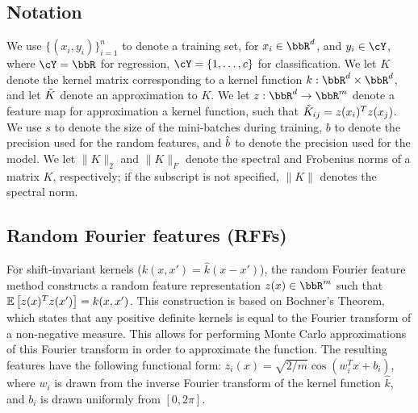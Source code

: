 \subsection{Notation}
We use $\{(x_i,y_i)\}_{i=1}^n$ to denote a training set, for $x_i \in \RR^d$, and $y_i \in \cY$, where $\cY = \RR$ for regression, $\cY = \{1,\ldots,c\}$ for classification.  We let $K$ denote the kernel matrix corresponding to a kernel function $k:\RR^d\times\RR^d$, and let $\tilde{K}$ denote an approximation to $K$. We let $z:\RR^d\rightarrow\RR^m$ denote a feature map for approximation a kernel function, such that $\tilde{K}_{ij} = z(x_i)^T z(x_j)$.  We use $s$ to denote the size of the mini-batches during training, $b$ to denote the precision used for the random features, and $\hat{b}$ to denote the precision used for the model.  We let $\|K\|_2$ and $\|K\|_F$ denote the spectral and Frobenius norms of a matrix $K$, respectively; if the subscript is not specified, $\|K\|$ denotes the spectral norm.

\subsection{Random Fourier features (RFFs)}
For shift-invariant kernels ($k(x,x') = \hat{k}(x-x')$), the random Fourier 
feature method \citep{rahimi07random} constructs a random feature representation 
$z(x) \in \RR^m$ such that $\expect{}{z(x)^T z(x')} = k(x,x')$. This construction 
is based on Bochner's Theorem, which states that any positive definite kernels is 
equal to the Fourier transform of a non-negative measure. This allows for performing
Monte Carlo approximations of this Fourier transform in order to approximate the 
function.  The resulting features have the following functional form: 
$z_i(x) = \sqrt{2/m}\cos(w_i^Tx + b_i)$, where $w_i$ is drawn from the inverse Fourier
transform of the kernel function $\hat{k}$, and $b_i$ is drawn uniformly from $[0,2\pi]$. 


